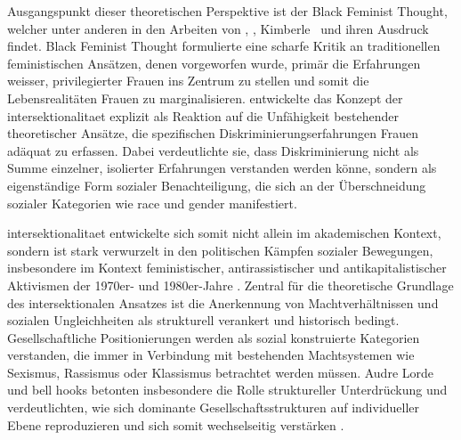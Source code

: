 
Ausgangspunkt dieser theoretischen Perspektive ist der Black Feminist Thought, welcher unter anderen in den Arbeiten von \textcite{hooksAintWomanBlack1981}, \textcite{lordeSisterOutsiderEssays1984}, Kimberle~\textcite{crenshawMappingMarginsIntersectionality1991} und \textcite{collinsBlackFeministThought2002} ihren Ausdruck findet. Black Feminist Thought formulierte eine scharfe Kritik an traditionellen feministischen Ansätzen, denen vorgeworfen wurde, primär die Erfahrungen weisser, privilegierter Frauen ins Zentrum zu stellen und somit die Lebensrealitäten \emph{} Frauen zu marginalisieren. \textcite{crenshawMappingMarginsIntersectionality1991} entwickelte das Konzept der \gls{intersektionalitaet} explizit als Reaktion auf die Unfähigkeit bestehender theoretischer Ansätze, die spezifischen Diskriminierungserfahrungen \emph{} Frauen adäquat zu erfassen. Dabei verdeutlichte sie, dass Diskriminierung nicht als Summe einzelner, isolierter Erfahrungen verstanden werden könne, sondern als eigenständige Form sozialer Benachteiligung, die sich an der Überschneidung sozialer Kategorien wie \gls{race} und \gls{gender} manifestiert.

\gls{intersektionalitaet} entwickelte sich somit nicht allein im akademischen Kontext, sondern ist stark verwurzelt in den politischen Kämpfen sozialer Bewegungen, insbesondere im Kontext feministischer, antirassistischer und antikapitalistischer Aktivismen der 1970er- und 1980er-Jahre \parencite{collinsBlackFeministThought2002}. Zentral für die theoretische Grundlage des intersektionalen Ansatzes ist die Anerkennung von Machtverhältnissen und sozialen Ungleichheiten als strukturell verankert und historisch bedingt. Gesellschaftliche Positionierungen werden als sozial konstruierte Kategorien verstanden, die immer in Verbindung mit bestehenden Machtsystemen wie Sexismus, Rassismus oder Klassismus betrachtet werden müssen. Audre Lorde und bell hooks betonten insbesondere die Rolle struktureller Unterdrückung und verdeutlichten, wie sich dominante Gesellschaftsstrukturen auf individueller Ebene reproduzieren und sich somit wechselseitig verstärken \parencite{collinsBlackFeministThought2002, hancockWhenMultiplicationDoesnt2007}.

